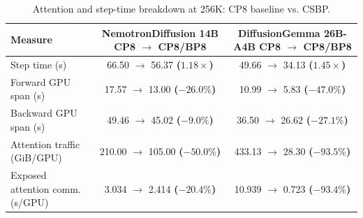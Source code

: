 \begin{table}[H]
  \centering
  \caption{Attention and step-time breakdown at 256K: CP8 baseline vs. CSBP.}
  \label{tab:operator-profile-256k}
  \small
  \setlength{\tabcolsep}{3pt}
  \renewcommand{\arraystretch}{1.12}
  \begin{tabular}{lcc}
    \toprule
    Measure & \shortstack{NemotronDiffusion 14B\\CP8 $\rightarrow$ CP8/BP8} & \shortstack{DiffusionGemma 26B-A4B\\CP8 $\rightarrow$ CP8/BP8} \\
    \midrule
    Step time (s)
      & 66.50 $\rightarrow$ 56.37 \textcolor{green!50!black}{\textbf{($1.18\times$)}}
      & 49.66 $\rightarrow$ 34.13 \textcolor{green!50!black}{\textbf{($1.45\times$)}} \\
    Forward GPU span (s)
      & 17.57 $\rightarrow$ 13.00 \textcolor{green!50!black}{\textbf{($-26.0\%$)}}
      & 10.99 $\rightarrow$ 5.83 \textcolor{green!50!black}{\textbf{($-47.0\%$)}} \\
    Backward GPU span (s)
      & 49.46 $\rightarrow$ 45.02 \textcolor{green!50!black}{\textbf{($-9.0\%$)}}
      & 36.50 $\rightarrow$ 26.62 \textcolor{green!50!black}{\textbf{($-27.1\%$)}} \\
    Attention traffic (GiB/GPU)
      & 210.00 $\rightarrow$ 105.00 \textcolor{green!50!black}{\textbf{($-50.0\%$)}}
      & 433.13 $\rightarrow$ 28.30 \textcolor{green!50!black}{\textbf{($-93.5\%$)}} \\
    Exposed attention comm. (s/GPU)
      & 3.034 $\rightarrow$ 2.414 \textcolor{green!50!black}{\textbf{($-20.4\%$)}}
      & 10.939 $\rightarrow$ 0.723 \textcolor{green!50!black}{\textbf{($-93.4\%$)}} \\
    \bottomrule
  \end{tabular}
\end{table}
